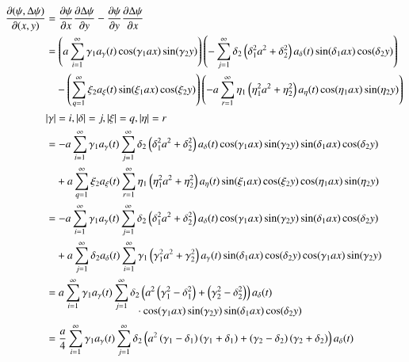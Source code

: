 \begin{align*}
\frac{\partial(\psi, \laplace\psi)}{\partial(x,y)}
&=
\frac{\partial\psi}{\partial x}
\frac{\partial\laplace\psi}{\partial y}
-
\frac{\partial\psi}{\partial y}
\frac{\partial\laplace\psi}{\partial x}
\\
&=
\left(
a
\sum_{i = 1}^{\infty}
\gamma_1
a_{\gamma}(t)
\cos(\gamma_1 ax) \sin(\gamma_2 y)
\right)
\left(
-
\sum_{j = 1}^{\infty}
\delta_2
\left(\delta_1^2 a^2 + \delta_2^2 \right)
a_{\delta}(t)
\sin(\delta_1 ax) \cos(\delta_2 y)
\right)
\\
&\phantom{={}}
-
\left(
\sum_{q = 1}^{\infty}
\xi_2
a_{\xi}(t)
\sin(\xi_1 ax) \cos(\xi_2 y)
\right)
\left(
-
a
\sum_{r = 1}^{\infty}
\eta_1
\left(\eta_1^2 a^2 + \eta_2^2 \right)
a_{\eta}(t)
\cos(\eta_1 ax) \sin(\eta_2 y)
\right)
\\
&|\gamma| = i, |\delta| = j, |\xi| = q, |\eta| = r
\\
&=
-
a
\sum_{i = 1}^{\infty}
\gamma_1
a_{\gamma}(t)
\sum_{j = 1}^{\infty}
\delta_2
\left(\delta_1^2 a^2 + \delta_2^2 \right)
a_{\delta}(t)
\cos(\gamma_1 ax) \sin(\gamma_2 y)
\sin(\delta_1 ax) \cos(\delta_2 y)
\\
&\phantom{={}}
+
a
\sum_{q = 1}^{\infty}
\xi_2
a_{\xi}(t)
\sum_{r = 1}^{\infty}
\eta_1
\left(\eta_1^2 a^2 + \eta_2^2 \right)
a_{\eta}(t)
\sin(\xi_1 ax) \cos(\xi_2 y)
\cos(\eta_1 ax) \sin(\eta_2 y)
\\
&=
-
a
\sum_{i = 1}^{\infty}
\gamma_1
a_{\gamma}(t)
\sum_{j = 1}^{\infty}
\delta_2
\left(\delta_1^2 a^2 + \delta_2^2 \right)
a_{\delta}(t) 
\cos(\gamma_1 ax) \sin(\gamma_2 y)
\sin(\delta_1 ax) \cos(\delta_2 y)
\\
&\phantom{={}}
+
a
\sum_{j = 1}^{\infty}
\delta_2
a_{\delta}(t)
\sum_{i = 1}^{\infty}
\gamma_1
\left(\gamma_1^2 a^2 + \gamma_2^2 \right)
a_{\gamma}(t)
\sin(\delta_1 ax) \cos(\delta_2 y)
\cos(\gamma_1 ax) \sin(\gamma_2 y)
\\
&=
a
\sum_{i = 1}^{\infty}
\gamma_1
a_{\gamma}(t)
\sum_{j = 1}^{\infty}
\delta_2
\left(
a^2 \left(\gamma_1^2 - \delta_1^2 \right)
+ \left(\gamma_2^2 - \delta_2^2 \right)
\right)
a_{\delta}(t)
\\[-2.5ex]
&\phantom{=abbbbb\sum\sum.....{}}
\cdot
\cos(\gamma_1 ax) \sin(\gamma_2 y)
\sin(\delta_1 ax) \cos(\delta_2 y)
\\
&=
\frac{a}{4}
\sum_{i = 1}^{\infty}
\gamma_1
a_{\gamma}(t)
\sum_{j = 1}^{\infty}
\delta_2
\left(
a^2 \left(\gamma_1 - \delta_1 \right)\left( \gamma_1 + \delta_1 \right)
+ \left(\gamma_2 - \delta_2 \right)\left( \gamma_2 + \delta_2 \right)
\right)
a_{\delta}(t)

\end{align*}
